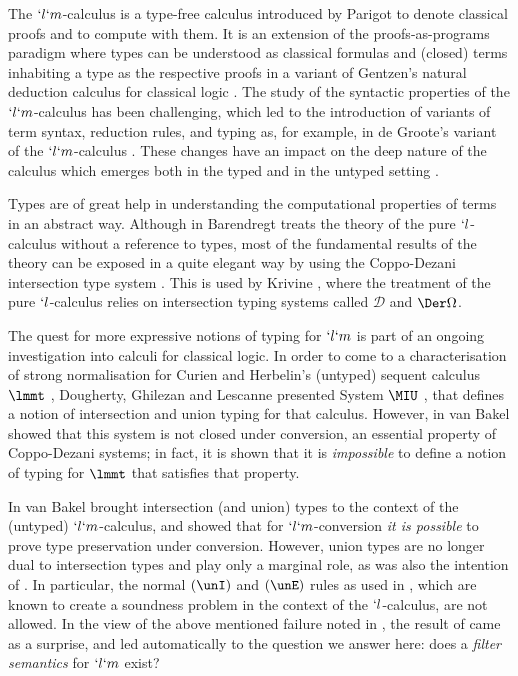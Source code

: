 \documentclass{CSML}
\begin{document}
The $`l`m$-calculus is a type-free calculus introduced by Parigot \cite{Parigot'92} to denote classical proofs and to compute with them. 
It is an extension of the proofs-as-programs paradigm where types can be understood as classical formulas and (closed) terms inhabiting a type as the respective proofs in a variant of Gentzen's natural deduction calculus for classical logic \cite{Gentzen'35}.
The study of the syntactic properties of the $`l`m$-calculus has been challenging, which led to the introduction of variants of term syntax, reduction rules, and typing as, for example, in de Groote's variant of the $`l`m$-calculus \cite{deGroote'94}.
These changes have an impact on the deep nature of the calculus which emerges both in the typed and in the untyped setting \cite{David-Py'01,Saurin'08}.

Types are of great help in understanding the computational properties of terms in an abstract way.
Although in \cite{Barendregt'84} Barendregt treats the theory of the pure $`l$-calculus without a reference to types, most of the fundamental results of the theory can be exposed in a quite elegant way by using the Coppo-Dezani intersection type system \cite{Coppo-Dezani'80}.
This is used by Krivine \cite{Krivine-book'93}, where the treatment of the pure $`l$-calculus relies on intersection typing systems called $ \mathcal D$ and $\Der \Omega$.

The quest for more expressive notions of typing for $`l`m$ is part of an ongoing investigation into calculi for classical logic.
In order to come to a characterisation of strong normalisation for Curien and Herbelin's (untyped) sequent calculus $ \lmmt$ \cite{Curien-Herbelin'00}, Dougherty, Ghilezan and Lescanne presented System $ \MIU$ \cite{DGL-ITRS'04,DGL-CDR'08}, that defines a notion of intersection and union typing for that calculus.
However, in \cite{Bakel-APAL'10} van Bakel showed that this system is not closed under conversion, an essential property of Coppo-Dezani systems; in fact, it is shown that it is \emph{impossible} to define a notion of typing for $ \lmmt$ that satisfies that property.

In \cite{Bakel-ITRS'10} van Bakel brought intersection (and union) types to the context of the (untyped) $`l`m$-calculus, and showed that for $`l`m$-conversion \emph{it is possible} to prove type preservation under conversion.
However, union types are no longer dual to intersection types and play only a marginal role, as was also the intention of \cite{DGL-CDR'08}.
In particular, the normal $(\unI)$ and $(\unE)$ rules as used in \cite{Barbanera-Dezani-Liguoro-IaC'95}, which are known to create a soundness problem in the context of the $`l$-calculus, are not allowed.
In the view of the above mentioned failure noted in \cite{Bakel-APAL'10}, the result of \cite{Bakel-ITRS'10} came as a surprise, and led automatically to the question we answer here: does a \emph{filter semantics} for $`l`m$ exist?
\end{document}

